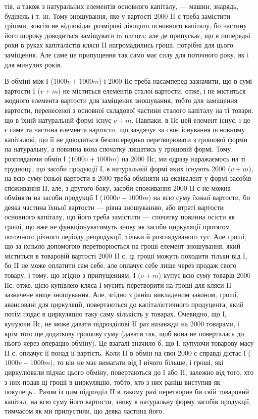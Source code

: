 \parcont{}  %
тів, а також з натуральних елементів основного капіталу, — машин,
знарядь, будівель і т. ін. Тому зношування, яке у вартості 2000 II с треба
замістити грішми, зовсім не відповідає розмірові діющого основного
капіталу, бо частину його щороку доводиться заміщувати in natura; але
де припускає, що в попередні роки в руках капіталістів кляси II нагромадились
гроші, потрібні для цього заміщення. Але саме це припущення
так само має силу для поточного року, як і для минулих років.

В обміні між І ($1000 v + 1000 m$) і 2000 ІІс треба насамперед зазначити,
що в сумі вартости І ($v + m$) не міститься елементів сталої
вартости, отже, і не міститься жодного елемента вартости для заміщення
зношування, тобто для заміщення вартости, перенесеної з основної
складової частини сталого капіталу на ті товари, що в їхній натуральній
формі існує $v + m$. Навпаки, в ІІс цей елемент існує, і це є саме та
частина елемента вартости, що завдячує за своє існування основному капіталові,
що її не доводиться безпосередньо перетворювати з грошової
форми на натуральну, а повинна вона спочатку лишатись у грошовій
формі. Тому, розглядаючи обмін І ($1000 v + 1000 m$) на 2000 ІІс, ми
одразу наражаємось на ті труднощі, що засоби продукції І, в натуральній
формі яких існують 2000 ($v + m$), на всю суму їхньої вартости в
2000 треба обміняти на еквівалент у формі засобів споживання II, але,
з другого боку, засоби споживання 2000 II с не можна обміняти на засоби
продукції І ($1000 v + 1000 m$) на всю суму їхньої вартости, бо
деяка частина їхньої вартости — рівна зношуванню, або втраті вартости
основного капіталу, що його треба замістити — спочатку повинна осісти
як гроші, що вже не функціонуватимуть знову як засоби циркуляції
протягом поточного річного періоду репродукції, тільки й розглядуваного
тут. Але гроші, що за їхньою допомогою перетворюється на гроші елемент
зношування, який міститься в товаровій вартості 2000 II с, ці гроші
можуть походити тільки від І, бо II не може оплатити сам себе,
але оплачує себе лише через продаж свого товару, і тому, що згідно
з припущенням, І ($v + m$) купує всю суму товарів 2000 ІІс; отже, цією
купівлею кляса І мусить перетворити на гроші для кляси II зазначене
вище зношування. Але, згідно з раніш викладеним законом, гроші, авансовані
для циркуляції, повертаються до капіталістичного продуцента,
який потім подає в циркуляцію таку саму кількість у товарах. Очевидно,
що І, купуючи ІІс, не може давати підрозділові II раз назавжди на
2000 товарами, і крім того ще додаткову грошову суму (давати так,
щоб вона не поверталась до нього через операцію обміну). Це взагалі
значило б, що І, купуючи товарову масу II с, оплачує її понад ії вартість.
Коли II в обмін на свої 2000 с справді дістає І ($1000 v + 1000 m$),
то він не має вимагати від І нічого більше, і гроші, які циркулювали
підчас цього обміну, повертаються до І або II, залежно від того, хто з
них подав ці гроші в циркуляцію, тобто, хто з них раніш виступив як
покупець\dots{} Разом із цим підрозділ II в такому разі перетворив би свій
товаровий капітал, на всю суму його вартости, знову в натуральну форму
засобів продукції, тимчасом як ми припустили, що деяка частина його,
\parbreak{}  %
